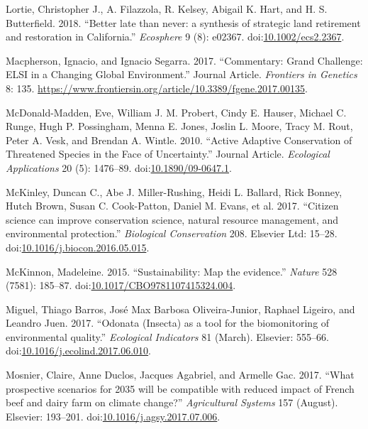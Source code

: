 \documentclass[fleqn,10pt]{wlpeerj} %
\begin{document}
\hypertarget{ref-Lortie2018}{}
Lortie, Christopher J., A. Filazzola, R. Kelsey, Abigail K. Hart, and H.
S. Butterfield. 2018. ``Better late than never: a synthesis of strategic
land retirement and restoration in California.'' \emph{Ecosphere} 9 (8):
e02367. doi:\href{https://doi.org/10.1002/ecs2.2367}{10.1002/ecs2.2367}.

\hypertarget{ref-Macpherson2017}{}
Macpherson, Ignacio, and Ignacio Segarra. 2017. ``Commentary: Grand
Challenge: ELSI in a Changing Global Environment.'' Journal Article.
\emph{Frontiers in Genetics} 8: 135.
\url{https://www.frontiersin.org/article/10.3389/fgene.2017.00135}.

\hypertarget{ref-McDonald2010}{}
McDonald-Madden, Eve, William J. M. Probert, Cindy E. Hauser, Michael C.
Runge, Hugh P. Possingham, Menna E. Jones, Joslin L. Moore, Tracy M.
Rout, Peter A. Vesk, and Brendan A. Wintle. 2010. ``Active Adaptive
Conservation of Threatened Species in the Face of Uncertainty.'' Journal
Article. \emph{Ecological Applications} 20 (5): 1476--89.
doi:\href{https://doi.org/10.1890/09-0647.1}{10.1890/09-0647.1}.

\hypertarget{ref-McKinley2017}{}
McKinley, Duncan C., Abe J. Miller-Rushing, Heidi L. Ballard, Rick
Bonney, Hutch Brown, Susan C. Cook-Patton, Daniel M. Evans, et al. 2017.
``Citizen science can improve conservation science, natural resource
management, and environmental protection.'' \emph{Biological
Conservation} 208. Elsevier Ltd: 15--28.
doi:\href{https://doi.org/10.1016/j.biocon.2016.05.015}{10.1016/j.biocon.2016.05.015}.

\hypertarget{ref-McKinnon2015}{}
McKinnon, Madeleine. 2015. ``Sustainability: Map the evidence.''
\emph{Nature} 528 (7581): 185--87.
doi:\href{https://doi.org/10.1017/CBO9781107415324.004}{10.1017/CBO9781107415324.004}.

\hypertarget{ref-Miguel2017}{}
Miguel, Thiago Barros, José Max Barbosa Oliveira-Junior, Raphael
Ligeiro, and Leandro Juen. 2017. ``Odonata (Insecta) as a tool for the
biomonitoring of environmental quality.'' \emph{Ecological Indicators}
81 (March). Elsevier: 555--66.
doi:\href{https://doi.org/10.1016/j.ecolind.2017.06.010}{10.1016/j.ecolind.2017.06.010}.

\hypertarget{ref-Mosnier2017}{}
Mosnier, Claire, Anne Duclos, Jacques Agabriel, and Armelle Gac. 2017.
``What prospective scenarios for 2035 will be compatible with reduced
impact of French beef and dairy farm on climate change?''
\emph{Agricultural Systems} 157 (August). Elsevier: 193--201.
doi:\href{https://doi.org/10.1016/j.agsy.2017.07.006}{10.1016/j.agsy.2017.07.006}.
\end{document}
